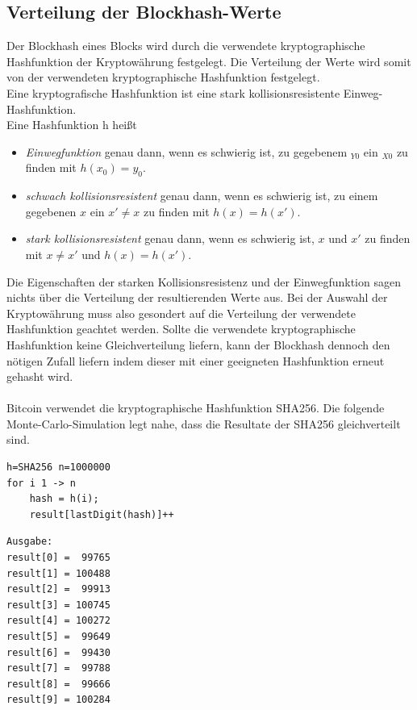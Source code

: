 \subsection{Verteilung der Blockhash-Werte}\label{btc_distribution}
Der Blockhash eines Blocks wird durch die verwendete kryptographische Hashfunktion der Kryptowährung festgelegt. Die Verteilung der Werte wird somit von der verwendeten kryptographische Hashfunktion festgelegt.\\
Eine kryptografische Hashfunktion ist eine stark kollisionsresistente Einweg-Hashfunktion.\\
Eine Hashfunktion h heißt
\begin{itemize}
\item \textit{Einwegfunktion} genau dann, wenn es schwierig ist, zu gegebenem $_{Y0}$ ein $_{X0}$ zu finden mit $h(x_{0}) = y_{0}$.
\item \textit{schwach kollisionsresistent} genau dann, wenn es schwierig ist, zu einem gegebenen $x$ ein $x' \neq x$ zu finden mit $h(x) = h(x')$.
\item \emph{stark kollisionsresistent} genau dann, wenn es schwierig ist, $x$ und $x'$ zu finden
mit $x \neq x'$ und $h(x) = h(x')$.
\end{itemize}Die Eigenschaften der starken Kollisionsresistenz und der Einwegfunktion sagen nichts über die Verteilung der resultierenden Werte aus. Bei der Auswahl der Kryptowährung muss also gesondert auf die Verteilung der verwendete Hashfunktion geachtet werden. Sollte die verwendete kryptographische Hashfunktion keine Gleichverteilung liefern, kann der Blockhash dennoch den nötigen Zufall liefern indem dieser mit einer geeigneten Hashfunktion erneut gehasht wird.\\\\
Bitcoin verwendet die kryptographische Hashfunktion SHA256.
Die folgende Monte-Carlo-Simulation legt nahe, dass die Resultate der SHA256 gleichverteilt sind.
\begin{verbatim}
h=SHA256 n=1000000
for i 1 -> n
    hash = h(i);
    result[lastDigit(hash)]++
\end{verbatim}
\begin{minipage}{0.5\textwidth}
\begin{verbatim}
Ausgabe:
result[0] =  99765
result[1] = 100488
result[2] =  99913
result[3] = 100745
result[4] = 100272
result[5] =  99649
result[6] =  99430
result[7] =  99788
result[8] =  99666
result[9] = 100284
\end{verbatim}
\end{minipage}

